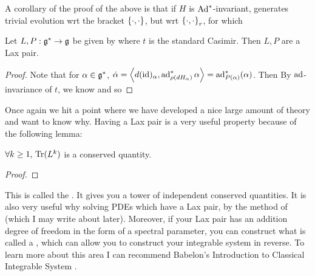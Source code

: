 \documentclass{article}
\begin{document}
\begin{remark}
A corollary of the proof of the above is that if $H$ is $\Ad^\ast$-invariant, generates trivial evolution wrt the bracket $\acomm[\cdot]{\cdot}$, but wrt $\acomm[\cdot]{\cdot}_r$, for which 
\end{remark}

\begin{prop}
Let $L,P: \mf{g}^\ast \to \mf{g}$ be given by 
where $t$ is the standard Casimir. Then $L,P$ are a Lax pair.  
\end{prop}
\begin{proof}
Note that for $\alpha \in \mf{g}^\ast$, $\dot{\alpha} = \pangle{d(\id)_\alpha, \ad^\ast_{\rho(dH_\alpha)}\alpha} = \ad_{P(\alpha)}^\ast(\alpha)$. Then 
By $\ad$-invariance of $t$, we know 
and so 
\end{proof}

\begin{remark}
Once again we hit a point where we have developed a nice large amount of theory and want to know why. Having a Lax pair is a very useful property because of the following lemma:

\begin{prop}
$\forall k \geq 1, \, \tr (L^k)$ is a conserved quantity. 
\end{prop}
\begin{proof}
\end{proof}
This is called the . It gives you a tower of independent conserved quantities. It is also very useful why solving PDEs which have a Lax pair, by the method of  (which I may write about later). Moreover, if your Lax pair has an addition degree of freedom in the form of a spectral parameter, you can construct what is called a , which can allow you to construct your integrable system in reverse. To learn more about this area I can recommend Babelon's Introduction to Classical Integrable System \cite{Babelon2003}. 
\end{remark}
\end{document}
